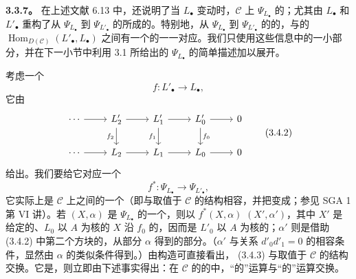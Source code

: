 \textbf{3.3.7。} 在上述文献 6.13 中，还说明了当 $L_\bullet$ 变动时，$\mathcal C$ 上 $\Psi_{L_\bullet}$ 的；尤其由 $L_\bullet$ 和 $L'_\bullet$ 重构了从 $\Psi_{L_\bullet}$ 到 $\Psi_{L'_\bullet}$ 的所成的。特别地，从 $\Psi_{L_\bullet}$ 到 $\Psi_{L'_\bullet}$ 的的，与的 $\operatorname{Hom}_{D(\mathcal C)}(L'_\bullet,L_\bullet)$ 之间有一个的一一对应。我们只使用这些信息中的一小部分，并在下一小节中利用 3.1 所给出的 $\Psi_{L_\bullet}$ 的简单描述加以展开。

考虑一个
\[
f:L'_\bullet\longrightarrow L_\bullet,\tag{3.4.1}
\]
它由
\[
\begin{tikzcd}
\cdots\arrow[r]&L'_2\arrow[r]\arrow[d,"f_2"']&L'_1\arrow[r]\arrow[d,"f_1"']&L'_0\arrow[r]\arrow[d,"f_0"]&0\\
\cdots\arrow[r]&L_2\arrow[r]&L_1\arrow[r]&L_0\arrow[r]&0
\end{tikzcd}\tag{3.4.2}
\]
给出。我们要给它对应一个
\[
f^*:\Psi_{L_\bullet}\longrightarrow\Psi_{L'_\bullet},\tag{3.4.3}
\]
它实际上是 $\mathcal C$ 上之间的一个（即与取值于 $\mathcal C$ 的结构相容，并把变成；参见 SGA 1 第 VI 讲）。若 $(X,\alpha)$ 是 $\Psi_{L_\bullet}$ 的一个，则以 $f^*(X,\alpha)$ 
$(X',\alpha')$，其中 $X'$ 是给定的、$L_0$ 以 $A$ 为核的 $X$ 沿 $f_0$ 的，因而是 $L'_0$ 以 $A$ 为核的；$\alpha'$ 则是借助 (3.4.2) 中第二个方块的，从部分 $\alpha$ 得到的部分。（$\alpha'$ 与关系 $d'_0d'_1=0$ 的相容条件，显然由 $\alpha$ 的类似条件得到。）由构造可直接看出， (3.4.3) 与取值于 $\mathcal C$ 的结构交换。它是，则立即由下述事实得出：在 $\mathcal C$ 的的中，“的”运算与“的”运算交换。

